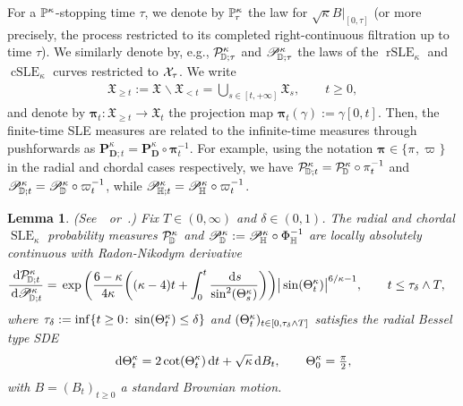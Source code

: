 \documentclass[a4paper, 11pt]{article}
\newtheorem{lemA}[theorem]{Lemma}
\theoremstyle{definition}
\numberwithin{equation}{section}
\numberwithin{figure}{section}
\newcommand{\SLE}[1][]{\operatorname{SLE}_{#1}}
\newcommand{\rSLE}[1][]{\operatorname{rSLE}_{#1}}
\newcommand{\cSLE}[1][]{\operatorname{cSLE}_{#1}}
\newcommand{\prXpaths}[1]{\boldsymbol{\pi}_{#1}}
\newcommand{\prDpaths}[1]{\pi_{#1}}
\newcommand{\prHpaths}[1]{\varpi_{#1}}
\newcommand{\rbessel}[1][]{{\ifx&#1&\else{_{#1}}\fi}\Theta^{\kappa}}
\newcommand{\Dpaths}[1][]{\cX_{#1}}
\newcommand{\Xpaths}[1][]{\mathfrak{X}_{#1}}
\newcommand{\Ddomain}{\mathbf{D}}
\newcommand{\rDmeas}[1]{\mathcal{P}^{#1}_{\!\bD}}
\newcommand{\cHmeas}[1]{\mathscr{P}^{#1}_{\!\bH}}
\newcommand{\cDmeas}[1]{\mathscr{P}^{#1}_{\!\bD}}
\newcommand{\rDmeasure}[2][]{\mathcal{P}^{#2}_{\!\bD;#1}}
\newcommand{\cHmeasure}[2][]{\mathscr{P}^{#2}_{\!\bH;#1}}
\newcommand{\cDmeasure}[2][]{\mathscr{P}^{#2}_{\!\bD;#1}}
\newcommand{\SLEmeasure}[2]{\mathbf{P}^{#2}_{\!\!#1}}
\newcommand{\BMmeasure}[2][]{\bP^{#2}_{\!#1}}
\begin{document}
For a $\BMmeasure{\kappa}$-stopping time $\tau$, we denote by $\BMmeasure[\tau]{\kappa}$ the law for $\sqrt{\kappa}B|_{[0,\tau]}$
(or more precisely, the process restricted to its completed right-continuous filtration up to time $\tau$). 
We similarly denote by, e.g., $\rDmeasure[\tau]{\kappa}$ and $\cDmeasure[\tau]{\kappa}$ 
the laws of the $\rSLE[\kappa]$ and $\cSLE[\kappa]$ curves restricted to $\Dpaths[\tau]$.
We write
\begin{align*}
\Xpaths[\ge t] := \Xpaths \smallsetminus \Xpaths[<t] = \bigcup_{s \in [t,+\infty]}\Xpaths[s], \qquad t \ge 0 ,
\end{align*}
and denote by $\prXpaths{t} \colon \Xpaths[\ge t] \to \Xpaths[t]$ the projection map $\prXpaths{t}(\gamma) := \gamma[0,t]$. 
Then, the finite-time SLE measures are related to the infinite-time measures through pushforwards as $\SLEmeasure{\Ddomain;t}{\kappa} = \SLEmeasure{\Ddomain}{\kappa}\circ \prXpaths{t}^{-1}$. 
For example, using the notation $\prXpaths{} \in \{\prDpaths{}, \prHpaths{}\}$ in the radial and chordal cases respectively, we have 
$\rDmeasure[t]{\kappa} = \rDmeas{\kappa} \circ \prDpaths{t}^{-1}$ and $\cDmeasure[t]{\kappa} = \cDmeas{\kappa} \circ \prHpaths{t}^{-1}$,
while $\cHmeasure[t]{\kappa} = \cHmeas{\kappa} \circ \prHpaths{t}^{-1}$.

\begin{lemA} \textnormal{(See~\cite[Section~3]{Lawler:Continuity_of_radial_and_two-sided_radial_SLE_at_the_terminal_point}~or~\cite[Proposition~3.6.2]{Lawler:SLE_book_draft}.)}
\label{thm:RN-derivative-radial-chordal}
Fix $T \in (0,\infty)$ and $\delta \in (0,1)$.  
The radial and chordal $\SLE[\kappa]$ probability measures 
$\rDmeas{\kappa}$ and $\cDmeas{\kappa} := \cHmeas{\kappa} \circ \Phi_\bH^{-1}$ are locally absolutely continuous with Radon-Nikodym derivative 
\begin{align}\label{eqn:radial-chordal-RN-derivative}
\frac{\ud \rDmeasure[t]{\kappa}}{\ud \cDmeasure[t]{\kappa}}
=\;& \exp\bigg(\frac{6-\kappa}{4\kappa}\bigg((\kappa-4) t + \int_0^t \frac{\ud s}{\sin^2(\rbessel_s)}\bigg)\bigg) 
\big|\sin (\rbessel_t)\big|^{6/\kappa - 1},
\qquad t \leq \tau_\delta \wedge T,
\end{align}
where $\tau_\delta := \inf\{ t \geq 0 \colon \sin(\rbessel_t) \leq \delta \}$ and 
$(\rbessel_t)_{t \in [0,\tau_\delta \wedge T]}$ satisfies the radial Bessel type SDE 
\begin{align}\label{eqn:rbessel-SDE}
\ud \rbessel_t = 2 \cot(\rbessel_t) \ud t + \sqrt{\kappa} \ud B_t , 
\qquad \rbessel_0 = \tfrac{\pi}{2},
\end{align}
with $B = (B_t)_{t \ge 0}$ a standard Brownian motion.
\end{lemA}
\end{document}
